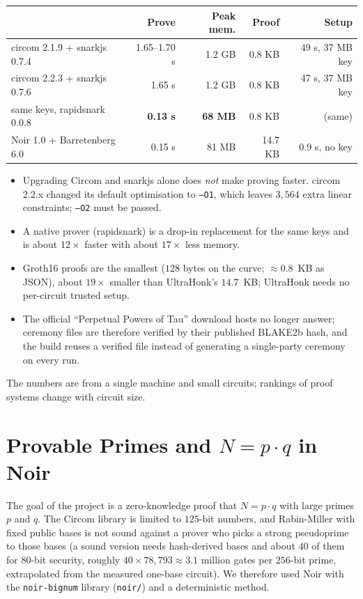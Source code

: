 \documentclass[12pt]{article}
\begin{document}
\begin{center}
\begin{tabular}{lrrrr}
\hline
 & Prove & Peak mem. & Proof & Setup \\
\hline
circom 2.1.9 + snarkjs 0.7.4 & 1.65--1.70 s & 1.2 GB & 0.8 KB & 49 s, 37 MB key \\
circom 2.2.3 + snarkjs 0.7.6 & 1.65 s & 1.2 GB & 0.8 KB & 47 s, 37 MB key \\
same keys, rapidsnark 0.0.8 & \textbf{0.13 s} & \textbf{68 MB} & 0.8 KB & (same) \\
Noir 1.0 + Barretenberg 6.0 & 0.15 s & 81 MB & 14.7 KB & 0.9 s, no key \\
\hline
\end{tabular}
\end{center}
\begin{itemize}
    \item Upgrading Circom and snarkjs alone does \emph{not} make proving faster. circom 2.2.x changed its default optimisation to \texttt{--O1}, which leaves $3{,}564$ extra linear constraints; \texttt{--O2} must be passed.
    \item A native prover (rapidsnark) is a drop-in replacement for the same keys and is about $12\times$ faster with about $17\times$ less memory.
    \item Groth16 proofs are the smallest ($128$ bytes on the curve; $\approx 0.8$~KB as JSON), about $19\times$ smaller than UltraHonk's $14.7$~KB; UltraHonk needs no per-circuit trusted setup.
    \item The official ``Perpetual Powers of Tau'' download hosts no longer answer; ceremony files are therefore verified by their published BLAKE2b hash, and the build reuses a verified file instead of generating a single-party ceremony on every run.
\end{itemize}
The numbers are from a single machine and small circuits; rankings of proof systems change with circuit size.

\section{Provable Primes and $N = p\cdot q$ in Noir}\label{sec:noir}

The goal of the project is a zero-knowledge proof that $N = p\cdot q$ with large primes $p$ and $q$. The Circom library is limited to $125$-bit numbers, and Rabin-Miller with fixed public bases is not sound against a prover who picks a strong pseudoprime to those bases (a sound version needs hash-derived bases and about $40$ of them for $80$-bit security, roughly $40 \times 78{,}793 \approx 3.1$ million gates per $256$-bit prime, extrapolated from the measured one-base circuit). We therefore used Noir with the \texttt{noir-bignum} library (\texttt{noir/}) and a deterministic method.
\end{document}
